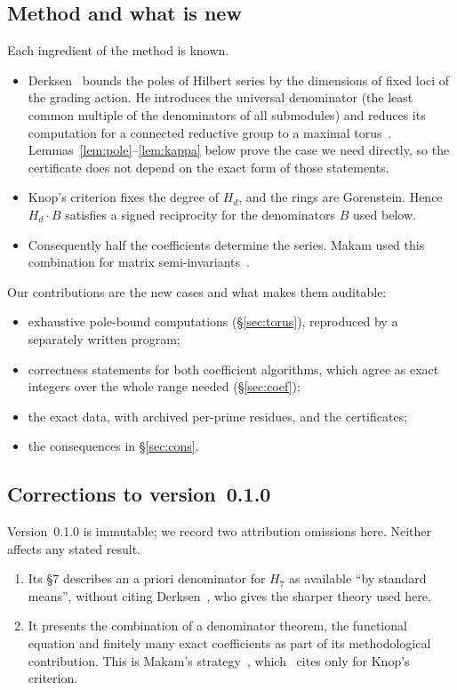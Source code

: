 \documentclass[11pt]{amsart}
\theoremstyle{definition}
\theoremstyle{remark}
\begin{document}
\subsection*{Method and what is new}
Each ingredient of the method is known.
\begin{itemize}
\item Derksen~\cite{Der05} bounds the poles of Hilbert series by the dimensions of fixed loci of the grading action. He introduces the universal denominator (the least common multiple of the denominators of all submodules) and reduces its computation for a connected reductive group to a maximal torus~\cite[Thms.~1.10, 3.4, 5.1]{Der05}. Lemmas~\ref{lem:pole}--\ref{lem:kappa} below prove the case we need directly, so the certificate does not depend on the exact form of those statements.
\item Knop's criterion fixes the degree of $H_d$, and the rings are Gorenstein. Hence $H_d\cdot B$ satisfies a signed reciprocity for the denominators $B$ used below.
\item Consequently half the coefficients determine the series. Makam used this combination for matrix semi-invariants~\cite[\S\S3,6]{Mak16}.
\end{itemize}
Our contributions are the new cases and what makes them auditable:
\begin{itemize}
\item exhaustive pole-bound computations (\S\ref{sec:torus}), reproduced by a separately written program;
\item correctness statements for both coefficient algorithms, which agree as exact integers over the whole range needed (\S\ref{sec:coef});
\item the exact data, with archived per-prime residues, and the certificates;
\item the consequences in \S\ref{sec:cons}.
\end{itemize}

\subsection*{Corrections to version~0.1.0}
Version~0.1.0 is immutable; we record two attribution omissions here. Neither affects any stated result.
\begin{enumerate}
\item Its \S7 describes an a priori denominator for $H_7$ as available ``by standard means'', without citing Derksen~\cite{Der05}, who gives the sharper theory used here.
\item It presents the combination of a denominator theorem, the functional equation and finitely many exact coefficients as part of its methodological contribution. This is Makam's strategy~\cite[\S6]{Mak16}, which~\cite{V01} cites only for Knop's criterion.
\end{enumerate}
\end{document}
